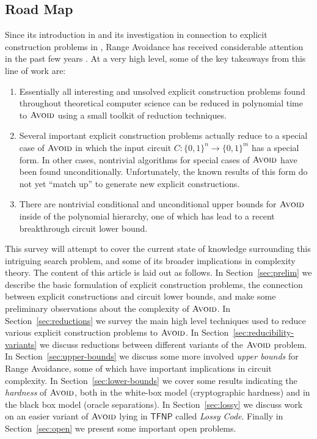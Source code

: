 \documentclass[11pt]{article}
\newcommand{\B}{\{0,1\}}
\newcommand{\avoid}{\textsc{Avoid}}
\begin{document}
\subsection{Road Map}
Since its introduction in \cite{total} and its investigation in connection to explicit construction problems in \cite{Korten1}, Range Avoidance has received considerable attention in the past few years \cite{RSW,low-depth-avoid,Korten2,hard-partial,avoid-io,CHR, Li,hardness-lwe,karthik,toni,vyas-williams}. At a very high level, some of the key takeaways from this line of work are:
\begin{enumerate}
    \item Essentially all interesting and unsolved explicit construction problems found throughout theoretical computer science can be reduced in polynomial time to $\avoid$ using a small toolkit of reduction techniques.
    \item Several important explicit construction problems actually reduce to a special case of $\avoid$ in which the input circuit $C: \B^n \to \B^m$ has a special form. In other cases, nontrivial algorithms for special cases of $\avoid$ have been found unconditionally. Unfortunately, the known results of this form do not yet ``match up'' to generate new explicit constructions.
    \item There are nontrivial conditional and unconditional upper bounds for $\avoid$ inside of the polynomial hierarchy, one of which has lead to a recent breakthrough circuit lower bound.
\end{enumerate}
This survey will attempt to cover the current state of knowledge surrounding this intriguing search problem, and some of its broader implications in complexity theory.
The content of this article is laid out as follows. In Section~\ref{sec:prelim} we describe the basic formulation of explicit construction problems, the connection between explicit constructions and circuit lower bounds, and make some preliminary observations about the complexity of $\avoid$. In Section~\ref{sec:reductions} we survey the main high level techniques used to reduce various explicit construction problems to $\avoid$. In Section~\ref{sec:reducibility-variants} we discuss reductions between different variants of the $\avoid$ problem.  In Section~\ref{sec:upper-bounds} we discuss some more involved \emph{upper bounds} for Range Avoidance, some of which have important implications in circuit complexity. In Section~\ref{sec:lower-bounds} we cover some results indicating the \emph{hardness} of $\avoid$, both in the white-box model (cryptographic hardness) and in the black box model (oracle separations). In Section~\ref{sec:lossy} we discuss work on an easier variant of $\avoid$ lying in $\mathsf{TFNP}$ called \emph{Lossy Code}. Finally in Section~\ref{sec:open} we present some important open problems.
\end{document}
